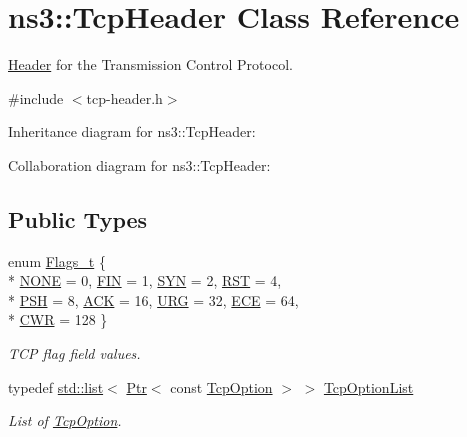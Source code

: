 \hypertarget{classns3_1_1TcpHeader}{}\section{ns3\+:\+:Tcp\+Header Class Reference}
\label{classns3_1_1TcpHeader}


\hyperlink{classns3_1_1Header}{Header} for the Transmission Control Protocol.  




{\ttfamily \#include $<$tcp-\/header.\+h$>$}



Inheritance diagram for ns3\+:\+:Tcp\+Header\+:


Collaboration diagram for ns3\+:\+:Tcp\+Header\+:
\subsection*{Public Types}
\begin{DoxyCompactItemize}
\item 
enum \hyperlink{classns3_1_1TcpHeader_a5f3d432941327854b5ad621e467479c6}{Flags\+\_\+t} \{ \\*
\hyperlink{classns3_1_1TcpHeader_a5f3d432941327854b5ad621e467479c6ad218656298d45743cc46f0ae23a4a876}{N\+O\+NE} = 0, 
\hyperlink{classns3_1_1TcpHeader_a5f3d432941327854b5ad621e467479c6ad523ac42b96f79a086261246e83b5244}{F\+IN} = 1, 
\hyperlink{classns3_1_1TcpHeader_a5f3d432941327854b5ad621e467479c6aa28ef8087c3cb5f3db10d728063b6ac0}{S\+YN} = 2, 
\hyperlink{classns3_1_1TcpHeader_a5f3d432941327854b5ad621e467479c6ace24c1738ff6e0ae9348ca913b9d10d8}{R\+ST} = 4, 
\\*
\hyperlink{classns3_1_1TcpHeader_a5f3d432941327854b5ad621e467479c6a3f1e9f1fc7466d436279cfe7ab9ef3db}{P\+SH} = 8, 
\hyperlink{classns3_1_1TcpHeader_a5f3d432941327854b5ad621e467479c6a1182e63050402c9f49208c62c1ec2d5c}{A\+CK} = 16, 
\hyperlink{classns3_1_1TcpHeader_a5f3d432941327854b5ad621e467479c6a03d58c80bf87169baf9f2f4896b7cf65}{U\+RG} = 32, 
\hyperlink{classns3_1_1TcpHeader_a5f3d432941327854b5ad621e467479c6ab680575f0340f1cf97daf2b666eadf7d}{E\+CE} = 64, 
\\*
\hyperlink{classns3_1_1TcpHeader_a5f3d432941327854b5ad621e467479c6a838a517641cb07df981cd25ce807ad41}{C\+WR} = 128
 \}\begin{DoxyCompactList}\small\item\em T\+CP flag field values. \end{DoxyCompactList}
\item 
typedef \hyperlink{openflow-interface_8h_afd9bcfa176617760671b67580f536fa7}{std\+::list}$<$ \hyperlink{classns3_1_1Ptr}{Ptr}$<$ const \hyperlink{classns3_1_1TcpOption}{Tcp\+Option} $>$ $>$ \hyperlink{classns3_1_1TcpHeader_ac28e919e2a5be37ada2b8f06cb0c4d4a}{Tcp\+Option\+List}
\begin{DoxyCompactList}\small\item\em List of \hyperlink{classns3_1_1TcpOption}{Tcp\+Option}. \end{DoxyCompactList}\end{DoxyCompactItemize}
